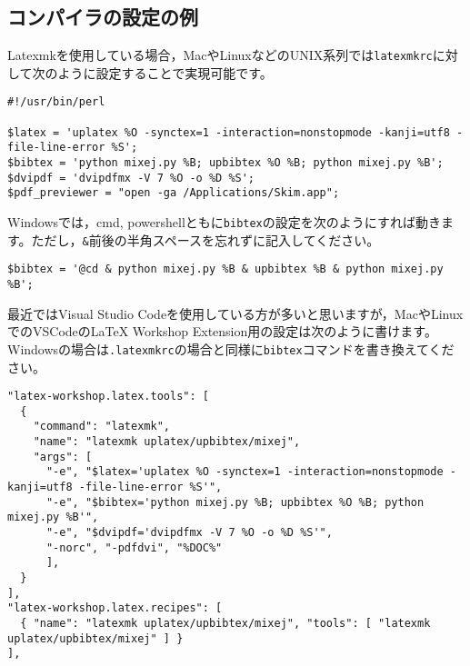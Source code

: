 \documentclass[11pt, a4paper, dvipdfmx, uplatex]{jsarticle}
\begin{document}
\subsection{コンパイラの設定の例}

Latexmkを使用している場合，MacやLinuxなどのUNIX系列では\texttt{latexmkrc}に対して次のように設定することで実現可能です。

\noindent\makebox[\linewidth]{\rule{\linewidth}{0.4pt}}\vspace{-0.5zw}
\begin{lstlisting}[style=onecol]
#!/usr/bin/perl

$latex = 'uplatex %O -synctex=1 -interaction=nonstopmode -kanji=utf8 -file-line-error %S';
$bibtex = 'python mixej.py %B; upbibtex %O %B; python mixej.py %B';
$dvipdf = 'dvipdfmx -V 7 %O -o %D %S';
$pdf_previewer = "open -ga /Applications/Skim.app";
\end{lstlisting}\vspace{-1.8zw}
\noindent\makebox[\linewidth]{\rule{\linewidth}{0.4pt}}\vspace{0.5zw}\par

\noindent
Windowsでは，cmd, powershellともに\texttt{bibtex}の設定を次のようにすれば動きます。ただし，\texttt{\&}前後の半角スペースを忘れずに記入してください。

\noindent\makebox[\linewidth]{\rule{\linewidth}{0.4pt}}\vspace{-0.5zw}
\begin{lstlisting}[style=onecol]
$bibtex = '@cd & python mixej.py %B & upbibtex %B & python mixej.py %B';
\end{lstlisting}\vspace{-1.8zw}
\noindent\makebox[\linewidth]{\rule{\linewidth}{0.4pt}}\vspace{0.5zw}\par


最近ではVisual Studio Codeを使用している方が多いと思いますが，MacやLinuxでのVSCodeのLaTeX Workshop Extension用の設定は次のように書けます。Windowsの場合は\texttt{.latexmkrc}の場合と同様に\texttt{bibtex}コマンドを書き換えてください。

\noindent\makebox[\linewidth]{\rule{\linewidth}{0.4pt}}\vspace{-0.5zw}
\begin{lstlisting}[style=onecol]
"latex-workshop.latex.tools": [
  {
    "command": "latexmk",
    "name": "latexmk uplatex/upbibtex/mixej",
    "args": [
      "-e", "$latex='uplatex %O -synctex=1 -interaction=nonstopmode -kanji=utf8 -file-line-error %S'",
      "-e", "$bibtex='python mixej.py %B; upbibtex %O %B; python mixej.py %B'",
      "-e", "$dvipdf='dvipdfmx -V 7 %O -o %D %S'",
      "-norc", "-pdfdvi", "%DOC%"
      ],
  }
],
"latex-workshop.latex.recipes": [
  { "name": "latexmk uplatex/upbibtex/mixej", "tools": [ "latexmk uplatex/upbibtex/mixej" ] }
],
\end{lstlisting}\vspace{-1.8zw}
\noindent\makebox[\linewidth]{\rule{\linewidth}{0.4pt}}\vspace{0.5zw}\par
\end{document}
